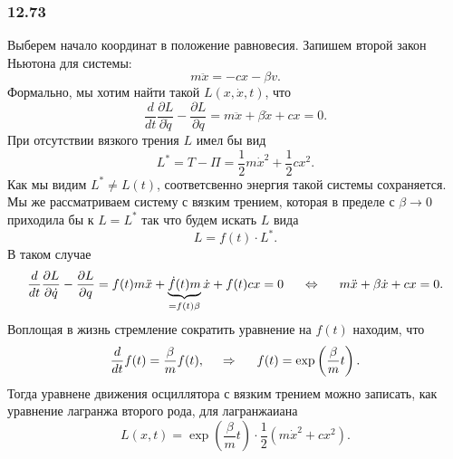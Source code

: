 \subsubsection*{12.73}
Выберем начало координат в положение равновесия. Запишем второй закон Ньютона для системы:
\begin{equation*}
    m \ddot{x} = -cx-\beta v.
\end{equation*}
Формально, мы хотим найти такой $L(x, \dot{x}, t)$, что 
\begin{equation*}
    \frac{d }{d t} \frac{\partial L}{\partial \dot{q}} - \frac{\partial L}{\partial q}  = m \ddot{x} + \beta \dot{x}  + cx = 0.
\end{equation*}
При отсутствии вязкого трения $L$ имел бы вид
\begin{equation*}
    L^* = T - \Pi = \frac{1}{2} m \dot{x}^2 + \frac{1}{2} cx^2.
\end{equation*}
Как мы видим $L^* \neq L(t)$, соответсвенно энергия такой системы сохраняется. Мы же рассматриваем систему с вязким трением, которая в пределе с $\beta \to 0$ приходила бы к $L = L^*$ так что будем искать $L$ вида 
\begin{equation*}
    L = f(t) \cdot L^*.
\end{equation*}
В таком случае
\begin{equation*}
    \frac{d }{d t} \frac{\partial L}{\partial \dot{q}} - \frac{\partial L}{\partial q}  =    
    f(t) m \ddot{x} + \underbrace{\dot{f} (t) m}_{= f(t) \beta}
     \dot{x}  + f(t) cx = 0
     \hspace{0.5cm} \Leftrightarrow \hspace{0.5cm} 
     m \ddot{x} + \beta \dot{x} +   c x = 0.
\end{equation*}
Воплощая в жизнь стремление сократить уравнение на $f(t)$ находим, что
\begin{equation*}
    \frac{d }{d t} f(t) = \frac{\beta}{m} f(t),
    \hspace{0.5cm} \Rightarrow \hspace{0.5cm} 
    f(t) = \exp\left(\frac{\beta}{m} t\right).
\end{equation*}
Тогда уравнене движения осциллятора с вязким трением можно записать, как уравнение лагранжа второго рода, для лагранжаиана
\begin{equation}
    L(x, t) = \exp \left(\frac{\beta}{m} t\right) \cdot \frac{1}{2} 
    \left(
        m \dot{x}^2 + c x^2
    \right).
\end{equation}